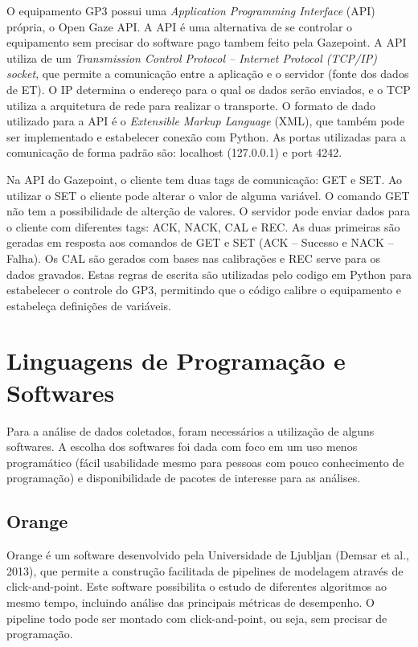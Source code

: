 O  equipamento GP3 possui uma \textit{Application Programming Interface} (API) própria, 
o Open Gaze API. 
A API é uma alternativa de se controlar o equipamento sem precisar do software 
pago tambem feito pela Gazepoint. A API utiliza de um \textit{Transmission Control Protocol – Internet Protocol (TCP/IP) 
socket}, que permite a comunicação entre a aplicação e o servidor (fonte dos dados de ET). 
O IP determina o endereço para o qual os dados serão enviados, e o TCP utiliza a arquitetura de 
rede para realizar o transporte. O formato de dado utilizado para a API é o \textit{Extensible Markup Language} (XML), 
que também pode ser implementado e estabelecer conexão com Python. 
As portas utilizadas para a comunicação de forma padrão são: 
localhost (127.0.0.1) e port 4242. 


Na API do Gazepoint, o cliente tem duas tags de comunicação: GET e SET. 
Ao utilizar o SET o cliente pode alterar o valor de alguma variável. 
O comando GET não tem a possibilidade de alterção de valores. O servidor 
pode enviar dados para o cliente com diferentes tags: ACK, NACK, CAL e REC. 
As duas primeiras são geradas em resposta aos comandos de GET e SET (ACK – Sucesso e NACK –Falha). 
Os CAL são gerados com bases nas calibrações e REC serve para os dados gravados. 
Estas regras de escrita são utilizadas pelo codigo em Python para estabelecer o controle do GP3,
 permitindo que o código calibre o equipamento e estabeleça definições de variáveis.


\section{Linguagens de Programação e Softwares}


Para a análise de dados coletados, foram necessários a utilização de alguns
softwares. A escolha dos softwares foi dada com foco em um uso menos programático
(fácil usabilidade mesmo para pessoas com pouco conhecimento de programação) 
e disponibilidade de pacotes de interesse para as análises.

\subsection{Orange}
Orange é um software desenvolvido pela Universidade de Ljubljan (Demsar et
al., 2013), que permite a construção facilitada de pipelines de modelagem através de
click-and-point. Este software possibilita o estudo de diferentes algoritmos ao mesmo
tempo, incluindo análise das principais métricas de desempenho. O pipeline todo
pode ser montado com click-and-point, ou seja, sem precisar de programação.

